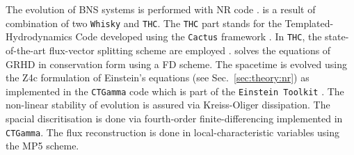 
The evolution of \ac{BNS} systems is performed with \wisky{} \ac{NR} code
 \citep{Radice:2013apa,Radice:2012cu,Radice:2013xpa,Radice:2013hxh,
    Radice:2015nva,Radice:2016dwd,Radice:2018pdn,Radice:2020ids}.
\wisky{} is a result of combination of two \texttt{Whisky} \citep{Baiotti:2004wn} and \texttt{THC}.
The \texttt{THC} part stands for the Templated-Hydrodynamics Code developed using the \texttt{Cactus} framework 
\citep{Goodale:2003}. 
In \texttt{THC}, the state-of-the-art flux-vector splitting scheme are employed . 
%
%
%
\wisky{} solves the equations of \ac{GRHD} in conservation form using a \ac{FD} scheme. 
%
The spacetime is evolved using the Z4c formulation of Einstein's equations
(see Sec.~\ref{sec:theory:nr}) as implemented in the \texttt{CTGamma} code
\citep{Pollney:2009yz,Reisswig:2013sqa}
which is part of the \texttt{Einstein Toolkit} \citep{Loffler:2011ay}.
%
%
The non-linear stability of evolution is assured via Kreiss-Oliger dissipation. 
The spacial discritisation is done via fourth-order finite-differencing implemented in \texttt{CTGamma}.
%
The flux reconstruction is done in local-characteristic variables using the \ac{MP5} scheme.

